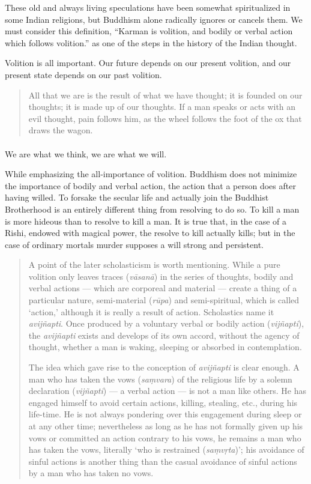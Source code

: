 \documentclass[a4paper, 11pt, oneside, english]{article}
\begin{document}
These old and always living speculations have been somewhat spiritualized in some Indian religions, but Buddhism alone radically ignores or cancels them. We must consider this definition, ``Karman is volition, and bodily or verbal action which follows volition.'' as one of the steps in the history of the Indian thought.

Volition is all important. Our future depends on our present volition, and our present state depends on our past volition.
\begin{quotation}
\small
All that we are is the result of what we have thought; it is founded on our thoughts; it is made up of our thoughts. If a man speaks or acts with an evil thought, pain follows him, as the wheel follows the foot of the ox that draws the wagon.
\end{quotation}
\paragraph{}
We are what we think, we are what we will.

While emphasizing the all-importance of volition. Buddhism does not minimize the importance of bodily and verbal action, the action that a person does after having willed. To forsake the secular life and actually join the Buddhist Brotherhood is an entirely different thing from resolving to do so. To kill a man is more hideous than to resolve to kill a man. It is true that, in the case of a Rishi, endowed with magical power, the resolve to kill actually kills; but in the case of ordinary mortals murder supposes a will strong and persistent.
\begin{quotation}
\small
A point of the later scholasticism is worth mentioning. While a pure volition only leaves traces (\emph{vāsanā}) in the series of thoughts, bodily and verbal actions --- which are corporeal and material --- create a thing of a particular nature, semi-material (\emph{rūpa}) and semi-spiritual, which is called `action,' although it is really a result of action. Scholastics name it \emph{avijñapti}. Once produced by a voluntary verbal or bodily action (\emph{vijñapti}), the \emph{avijñapti} exists and develops of its own accord, without the agency of thought, whether a man is waking, sleeping or absorbed in contemplation.

The idea which gave rise to the conception of \emph{avijñapti} is clear enough. A man who has taken the vows (\emph{saṃvara}) of the religious life by a solemn declaration (\emph{vijñapti}) --- a verbal action --- is not a man like others. He has engaged himself to avoid certain actions, killing, stealing, etc., during his life-time. He is not always pondering over this engagement during sleep or at any other time; nevertheless as long as he has not formally given up his vows or committed an action contrary to his vows, he remains a man who has taken the vows, literally `who is restrained (\emph{saṃvṛta})'; his avoidance of sinful actions is another thing than the casual avoidance of sinful actions by a man who has taken no vows.
\end{quotation}
\end{document}
